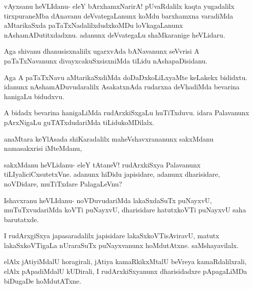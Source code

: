 \documentclass{article}
\begin{document}
\begin{mng}%
vAyxsanu heVLIdanu- eleY bArxhamxNarirA! pUvaRdalilx kaqta yugadalilx 
tirxpuraneMba dAnavanu deVvategaLanunx koMdu barxhamxna varadiMda 
aMtarikaSxda paTaTxNadalilxdudxkoMDu loVkagaLanunx 
nAshamADutitxdadxnu. adanunx deVvategaLu shaMkaranige heVLidaru.
\end{mng}

\begin{mng}%
Aga shivanu dhanusisxnaliilx ugarxvAda bANavanunx seVvrisi A 
paTaTxNavanunx divayxcakuSxsisxniMda tiLidu nAshapaDisidanu.
\end{mng}

\begin{mng}%
Aga A paTaTxNavu aMtarikaSxdiMda doDaDxkoLiLxyaMte keLakekx bididxtu. 
idanunx nAshamADuvudaralilx AsakatxnAda rudarxna deVhadiMda bevarina 
hanigaLu bidudxvu.
\end{mng}

\begin{mng}%
A bidadx bevarina hanigaLiMda rudArxkiSxgaLu huTiTxduvu. idara 
Palavanunx pArxNigaLu guTATxdudariMda tiLidukoMDilalx.
\end{mng}

\begin{mng}%
anaMtara keYlAsada shiKaradalilx maheVshavxrananunx sakxMdanu 
namasakxrisi iMteMdanu,
\end{mng}

\begin{mng}%
sakxMdanu heVLidanu- eleY tAtaneV! rudArxkiSxya Palavanunx 
tiLIyaliciCxsutetxVne. adanunx hiDidu japisidare, adanunx dharisidare, 
noVDidare, muTiTxdare PalagaLeVnu?
\end{mng}

\begin{mng}%
Ishavxranu heVLIdanu- noVDuvudariMda lakaSxdaSuTx puNayxvU, 
muTuTxvudariMda koVTi puNayxvU, dharisidare hatutxkoVTi puNayxvU saha 
barutatxde.
\end{mng}

\begin{mng}%
I rudArxgiSxya japasaradalilx japisidare lakaSxkoVTisAviravU, matutx 
lakaSxkoVTigaLa nUraraSuTx puNayxvanunx hoMdutAtxne. saMshayavilalx.
\end{mng}

\begin{mng}%
elAlx jAtiyiMdalU horagirali, jAtiya kamaRkikxMtalU beVreya 
kamaRdalilxrali, elAlx pApadiMdalU kUDirali, I rudArxkiSxyanunx 
dharisidadxre pApagaLiMDa biDugaDe hoMdutATxne.
\end{mng}
\end{document}
